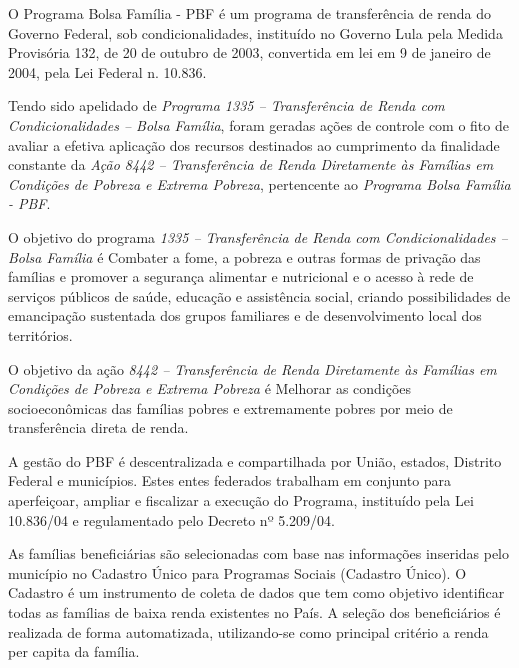\documentclass[12pt]{article}
\begin{document}
	O Programa Bolsa Família - PBF é um programa de transferência de renda do Governo Federal, sob condicionalidades, instituído no Governo Lula pela Medida Provisória 132, de 20 de outubro de 2003, convertida em lei em 9 de janeiro de 2004, pela Lei Federal n. 10.836.
	
	Tendo sido apelidado de \emph{Programa 1335 – Transferência de Renda com Condicionalidades – Bolsa Família}, foram geradas ações de controle com o fito de avaliar a efetiva aplicação dos recursos destinados ao cumprimento da finalidade constante da \emph{Ação 8442 – Transferência de Renda Diretamente às Famílias em Condições de Pobreza e Extrema Pobreza}, pertencente ao \emph{Programa Bolsa Família - PBF}.
	
	O objetivo do programa \emph{1335 – Transferência de Renda com Condicionalidades – Bolsa Família} é Combater a fome, a pobreza e outras formas de privação das famílias e promover a segurança alimentar e nutricional e o acesso à rede de serviços públicos de saúde, educação e assistência social, criando possibilidades de emancipação sustentada dos grupos familiares e de desenvolvimento local dos territórios.
	
	O objetivo da ação \emph{8442 – Transferência de Renda Diretamente às Famílias em Condições de Pobreza e Extrema Pobreza} é Melhorar as condições socioeconômicas das famílias pobres e extremamente pobres por meio de transferência direta de renda.
	
	A gestão do PBF é descentralizada e compartilhada por União, estados, Distrito Federal e municípios. Estes entes federados trabalham em conjunto para aperfeiçoar, ampliar e fiscalizar a execução do Programa, instituído pela Lei 10.836/04 e regulamentado pelo Decreto nº 5.209/04.
	
	As famílias beneficiárias são selecionadas com base nas informações inseridas pelo município no Cadastro Único para Programas Sociais (Cadastro Único). O Cadastro é um instrumento de coleta de dados que tem como objetivo identificar todas as famílias de baixa renda existentes no País. A seleção dos beneficiários é realizada de forma automatizada, utilizando-se como principal critério a renda per capita da família.
	
\end{document}
